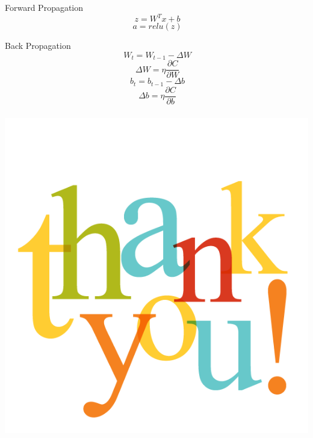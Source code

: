 \documentclass[xcolor=dvipsnames]{beamer}
\begin{document}
        \begin{frame}{Forward Propagation}
            \[\ z = W^Tx + b\]
            \[\ a = relu(z)\]
        \end{frame}
        \begin{frame}{Back Propagation}
            \[\ W_t = W_{t-1} - \Delta W\]
            \[\ \Delta W = \eta \frac{\partial{C}}{\partial{W}}\]
            \[\ b_t = b_{t-1} - \Delta b\]
            \[\ \Delta b = \eta \frac{\partial{C}}{\partial{b}}\]
        \end{frame}
        \begin{frame}\frametitle{}
            \centering
            \includegraphics[scale=0.3]{Imagens/thankyou.png}
        \end{frame}
\end{document}
